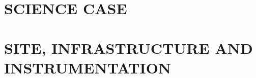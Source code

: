 \documentclass[url,11pt,fleqn]{book} %
\begin{document}




\part{SCIENCE CASE}

\part{SITE, INFRASTRUCTURE AND INSTRUMENTATION}

\label{part:Instrumental}







%



\appendix


\clearpage %
{}



%
\end{document}
